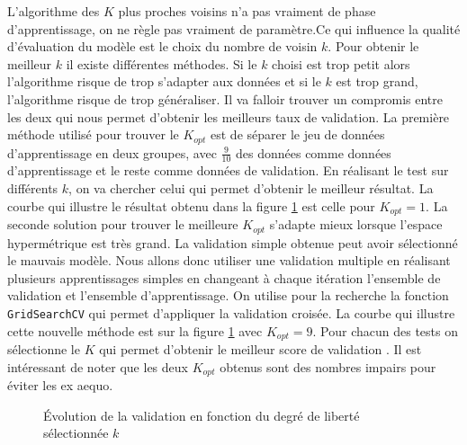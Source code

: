 \documentclass[twocolumn,10pt]{article}
\def\pycode#1{\texttt{#1}}
\begin{document}
L'algorithme des $K$ plus proches voisins n'a pas vraiment de phase d'apprentissage, on ne règle pas vraiment de paramètre.Ce qui influence la qualité d'évaluation du modèle est le choix du nombre de voisin $k$. Pour obtenir le meilleur $k$ il existe différentes méthodes. Si le $k$ choisi est trop petit alors l'algorithme risque de trop s'adapter aux données et si le $k$ est trop grand, l'algorithme risque de trop généraliser. Il va falloir trouver un compromis entre les deux qui nous permet d'obtenir les meilleurs taux de validation. La première méthode utilisé pour trouver le $K_{opt}$ est de séparer le jeu de données d'apprentissage en deux groupes, avec $\frac{9}{10}$ des données comme données d'apprentissage et le reste comme données de validation. En réalisant le test sur différents $k$, on va chercher celui qui permet d'obtenir le meilleur résultat. La courbe qui illustre le résultat obtenu dans la figure \ref{fig:k_plus_proche_voisin} est celle pour $K_{opt}=1$. La seconde solution pour trouver le meilleure $K_{opt}$ s'adapte mieux lorsque l'espace hypermétrique est très grand. La validation simple obtenue peut avoir sélectionné le mauvais modèle. Nous allons donc utiliser une validation multiple en réalisant plusieurs apprentissages simples en changeant à chaque itération l'ensemble de validation et l'ensemble d'apprentissage. On utilise pour la recherche la fonction \pycode{GridSearchCV} qui permet d'appliquer la validation croisée. La courbe qui illustre cette nouvelle méthode est sur la figure \ref{fig:k_plus_proche_voisin} avec $K_{opt}=9$. Pour chacun des tests on sélectionne le $K$ qui permet d'obtenir le meilleur score de validation	. Il est intéressant de noter que les deux $K_{opt}$ obtenus sont des nombres impairs pour éviter les ex aequo. 

\begin{figure}[htbp]
\centering
    \qquad
    \caption{Évolution de la validation en fonction du degré de liberté sélectionnée $k$}%
    \label{fig:k_plus_proche_voisin}%
\end{figure}
\end{document}

